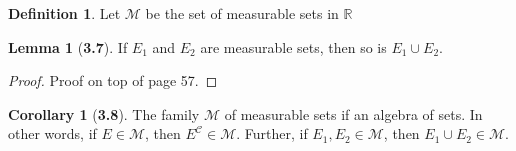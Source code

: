 \documentclass[12pt]{article}
\newcommand{\R}{\mathbb{R}}
\newcommand{\C}{\mathscr{C}}
\theoremstyle{definition}
\newtheorem*{definition}{Definition}
\newtheorem*{lemma}{Lemma}
\newtheorem*{cor}{Corollary}
\begin{document}
\begin{definition}
    Let \( \mathcal{M} \) be the set of measurable sets in \( \R \) 
\end{definition}

\begin{lemma}[\textbf{3.7}]

    If \( E_1 \) and \( E_2 \) are measurable sets, then so is \( E_1 \cup E_2 \).

        \begin{proof}
            Proof on top of page 57.
        \end{proof}
    
\end{lemma}

\begin{cor}[\textbf{3.8}]

    The family \( \mathcal{M} \) of measurable sets if an algebra of sets. In other words, if \( E \in \mathcal{M} \), then \( E^{\C} \in \mathcal{M} \). Further, if \( E_1, E_2 \in \mathcal{M} \), then \( E_1 \cup E_2 \in \mathcal{M} \).
    
\end{cor}
\end{document}
